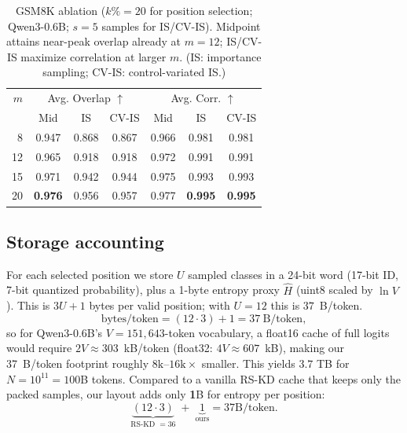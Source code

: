 \documentclass[11pt]{article}
\begin{document}
\vspace{-0.5em}
\begin{table}[h]
	\centering
	\small
	\setlength{\tabcolsep}{6pt}
	\begin{tabular}{rcccccc}
		\toprule
		$m$ & \multicolumn{3}{c}{Avg. Overlap $\uparrow$} & \multicolumn{3}{c}{Avg. Corr. $\uparrow$}                                                   \\
		\cmidrule(lr){2-4}\cmidrule(lr){5-7}
		    & Mid                                         & IS                                        & CV-IS & Mid   & IS             & CV-IS          \\
		\midrule
		8   & 0.947                                       & 0.868                                     & 0.867 & 0.966 & 0.981          & 0.981          \\
		12  & 0.965                                       & 0.918                                     & 0.918 & 0.972 & 0.991          & 0.991          \\
		15  & 0.971                                       & 0.942                                     & 0.944 & 0.975 & 0.993          & 0.993          \\
		20  & \textbf{0.976}                              & 0.956                                     & 0.957 & 0.977 & \textbf{0.995} & \textbf{0.995} \\
		\bottomrule
	\end{tabular}
	\caption{GSM8K ablation ($k\%{=}20$ for position selection; Qwen3-0.6B; $s{=}5$ samples for IS/CV-IS). Midpoint attains near-peak overlap already at $m{=}12$; IS/CV-IS maximize correlation at larger $m$. (IS: importance sampling; CV-IS: control-variated IS.)}
	\label{tab:entropy-ablation}
\end{table}
\vspace{-0.75em}

\subsection{Storage accounting}
For each selected position we store $U$ sampled classes in a 24-bit word (17-bit ID, 7-bit quantized probability), plus a 1-byte entropy proxy $\hat H$ (uint8 scaled by $\ln V$).
This is $3U+1$ bytes per valid position; with $U{=}12$ this is $37$~B/token.
\[
	\text{bytes/token} = (12 \cdot 3) + 1 = 37\ \text{B/token},
\]
so for Qwen3-0.6B's $V{=}151{,}643$-token vocabulary, a float16 cache of full logits would require $2V \approx 303$~kB/token (float32: $4V \approx 607$~kB), making our 37~B/token footprint roughly $8\text{k}$--$16\text{k}\times$ smaller.
This yields $3.7$ TB for $N{=}10^{11}{=}100$B tokens. Compared to a vanilla RS-KD cache that keeps only the packed samples, our layout adds only \textbf{1}B for entropy per position:
\[
	\underbrace{(12 \cdot 3)}_{\text{RS-KD }=36} \;+\; \underbrace{1}_{\text{ours}}
	= 37\text{B/token}.
\]
\end{document}
